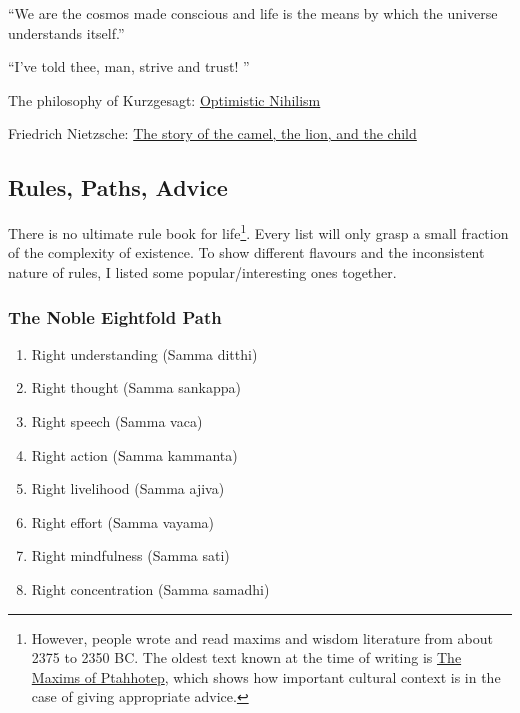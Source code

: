 \documentclass{article}
\begin{document}
\vspace{1cm}
{``We are the cosmos made conscious and life is the means by which the universe understands itself.''
\\[5pt]
}

\vspace{1cm}
{``I've told thee, man, strive and trust! ''
\\[5pt]
}

The philosophy of Kurzgesagt: \href{https://www.youtube.com/watch?v=MBRqu0YOH14}{Optimistic Nihilism}

Friedrich Nietzsche:
\href{https://web.archive.org/web/20201105030858/https://medium.com/the-sophist/nietzsches-three-steps-to-a-meaningful-life-f063793adfc4}{The story of the camel, the lion, and the child}

\subsection{Rules, Paths, Advice}

There is no ultimate rule book for life\footnote{However, people wrote and read maxims and wisdom literature from about 2375 to 2350 BC. The oldest text known at the time of writing is \href{https://en.wikipedia.org/wiki/The_Maxims_of_Ptahhotep}{The Maxims of Ptahhotep}, which shows how important cultural context is in the case of giving appropriate advice.}. Every list will only grasp a small fraction of the complexity of existence. To show different flavours and the inconsistent nature of rules, I listed some popular/interesting ones together.



\subsubsection{The Noble Eightfold Path}

\begin{enumerate}
    \item Right understanding (Samma ditthi)
    \item Right thought (Samma sankappa)
    \item Right speech (Samma vaca) 
    \item Right action (Samma kammanta)
    \item Right livelihood (Samma ajiva) 
    \item Right effort (Samma vayama)
    \item Right mindfulness (Samma sati)
    \item Right concentration (Samma samadhi)
\end{enumerate}
\end{document}
